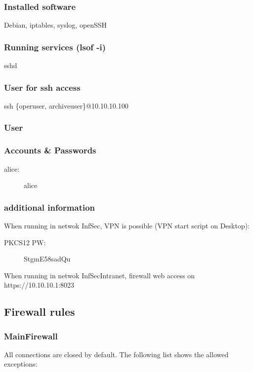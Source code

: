 \documentclass[a4paper, toc=index, 12pt, DIV14, twoside, BCOR2cm, headsepline, numbers=noenddot, bibliography=totoc]{scrbook}
\begin{document}
\subsubsection*{Installed software}
Debian, iptables, syslog, openSSH
\subsubsection*{Running services (lsof -i)}
sshd
\subsubsection*{User for ssh access}
ssh \{operuser, archiveuser\}@10.10.10.100

\subsubsection{User}
\subsubsection*{Accounts \& Passwords}
\begin{description}
\item[alice:] alice
\end{description}
\subsubsection*{additional information}
When running in netwok InfSec, VPN is possible (VPN start script on Desktop):\newline
\begin{description}
\item[PKCS12 PW:] StgmE58sadQu
\end{description}
When running in netwok InfSecIntranet, firewall web access on https://10.10.10.1:8023


\subsection{Firewall rules}
\subsubsection{MainFirewall}
All connections are closed by default. The following list shows the allowed exceptions:\newline
\end{document}
